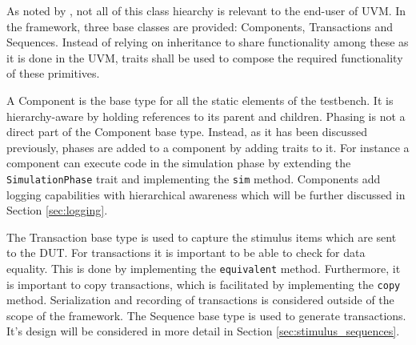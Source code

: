 \documentclass[11pt,a4paper]{report}
\newcommand{\ttt}{\texttt}
\begin{document}
As noted by \citeauthor{sutherland2015uvm} \cite{sutherland2015uvm}, not all of this class hiearchy is relevant to
the end-user of UVM. In the framework, three base classes are provided: Components, Transactions and Sequences.
Instead of relying on inheritance to share functionality among these as it is done in the UVM, traits shall be used
to compose the required functionality of these primitives.

A Component is the base type for all the static elements of the testbench. It is hierarchy-aware by holding
references to its parent and children. Phasing is not a direct part of the Component base type. Instead, as it has
been discussed previously, phases are added to a component by adding traits to it. For instance a component can
execute code in the simulation phase by extending the \ttt{SimulationPhase} trait and implementing the \ttt{sim}
method. Components add logging capabilities with hierarchical awareness which will be further discussed in Section
\ref{sec:logging}.

The Transaction base type is used to capture the stimulus items which are sent to the DUT. For transactions it is
important to be able to check for data equality. This is done by implementing the \ttt{equivalent} method.
Furthermore, it is important to copy transactions, which is facilitated by implementing the \ttt{copy} method.
Serialization and recording of transactions is considered outside of the scope of the framework. The Sequence base
type is used to generate transactions. It's design will be considered in more detail in Section \ref{sec:stimulus_sequences}.
\end{document}
